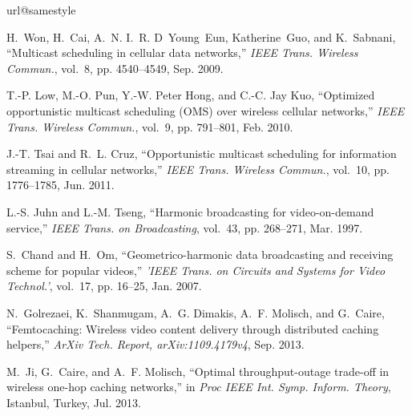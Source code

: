 \documentclass[conference]{IEEEtran}
\newcommand{\0}{\vect{0}}
\newcommand{\1}{\vect{1}}
\begin{document}
\begin{thebibliography}{10}
\providecommand{\url}[1]{#1}
\csname url@samestyle\endcsname
\providecommand{\newblock}{\relax}
\providecommand{\bibinfo}[2]{#2}
\providecommand{\BIBentrySTDinterwordspacing}{\spaceskip=0pt\relax}
\providecommand{\BIBentryALTinterwordstretchfactor}{4}
\providecommand{\BIBentryALTinterwordspacing}{\spaceskip=\fontdimen2\font plus
\BIBentryALTinterwordstretchfactor\fontdimen3\font minus
  \fontdimen4\font\relax}
\providecommand{\BIBforeignlanguage}[2]{{\expandafter\ifx\csname l@#1\endcsname\relax
\typeout{** WARNING: IEEEtran.bst: No hyphenation pattern has been}\typeout{** loaded for the language `#1'. Using the pattern for}\typeout{** the default language instead.}\else
\language=\csname l@#1\endcsname
\fi
#2}}
\providecommand{\BIBdecl}{\relax}
\BIBdecl

H.~Won, H.~Cai, A.~N. I.~R. D~Young~Eun, Katherine~Guo, and K.~Sabnani,
  ``Multicast scheduling in cellular data networks,'' \emph{{IEEE} Trans.
  Wireless Commun.}, vol.~8, pp. 4540--4549, Sep. 2009.

T.-P. Low, M.-O. Pun, Y.-W. {Peter Hong}, and C.-C. {Jay Kuo}, ``Optimized
  opportunistic multicast scheduling ({OMS}) over wireless cellular networks,''
  \emph{{IEEE} Trans. Wireless Commun.}, vol.~9, pp. 791--801, Feb. 2010.

J.-T. Tsai and R.~L. Cruz, ``Opportunistic multicast scheduling for information
  streaming in cellular networks,'' \emph{{IEEE} Trans. Wireless Commun.},
  vol.~10, pp. 1776--1785, Jun. 2011.

L.-S. Juhn and L.-M. Tseng, ``Harmonic broadcasting for video-on-demand
  service,'' \emph{IEEE Trans. on Broadcasting}, vol.~43, pp. 268--271, Mar.
  1997.

S.~Chand and H.~Om, ``Geometrico-harmonic data broadcasting and receiving
  scheme for popular videos,'' \emph{'IEEE Trans. on Circuits and Systems for
  Video Technol.'}, vol.~17, pp. 16--25, Jan. 2007.

N.~Golrezaei, K.~Shanmugam, A.~G. Dimakis, A.~F. Molisch, and G.~Caire,
  ``Femtocaching: Wireless video content delivery through distributed caching
  helpers,'' \emph{ArXiv Tech. Report, arXiv:1109.4179v4}, Sep. 2013.

M.~Ji, G.~Caire, and A.~F. Molisch, ``Optimal throughput-outage trade-off in
  wireless one-hop caching networks,'' in \emph{Proc IEEE Int. Symp. Inform.
  Theory}, Istanbul, Turkey, Jul. 2013.


\end{thebibliography}
\end{document}
